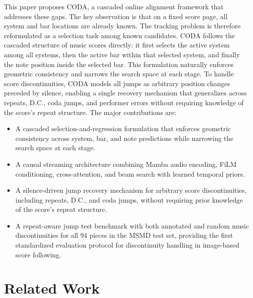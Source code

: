\documentclass{article}
\begin{document}
This paper proposes CODA, a cascaded online alignment framework that addresses these gaps. The key observation is that on a fixed score page, all system and bar locations are already known. The tracking problem is therefore reformulated as a selection task among known candidates. CODA follows the cascaded structure of music scores directly: it first selects the active system among all systems, then the active bar within that selected system, and finally the note position inside the selected bar. This formulation naturally enforces geometric consistency and narrows the search space at each stage. To handle score discontinuities, CODA models all jumps as arbitrary position changes preceded by silence, enabling a single recovery mechanism that generalizes across repeats, D.C., coda jumps, and performer errors without requiring knowledge of the score's repeat structure. The major contributions are:
\begin{itemize}
\item A cascaded selection-and-regression formulation that enforces geometric consistency across system, bar, and note predictions while narrowing the search space at each stage.
\item A causal streaming architecture combining Mamba audio encoding, FiLM conditioning, cross-attention, and beam search with learned temporal priors.
\item A silence-driven jump recovery mechanism for arbitrary score discontinuities, including repeats, D.C., and coda jumps, without requiring prior knowledge of the score's repeat structure.
\item A repeat-aware jump test benchmark with both annotated and random music discontinuities for all 94 pieces in the MSMD test set, providing the first standardized evaluation protocol for discontinuity handling in image-based score following.
\end{itemize}

\section{Related Work}\label{sec:related}
\end{document}
